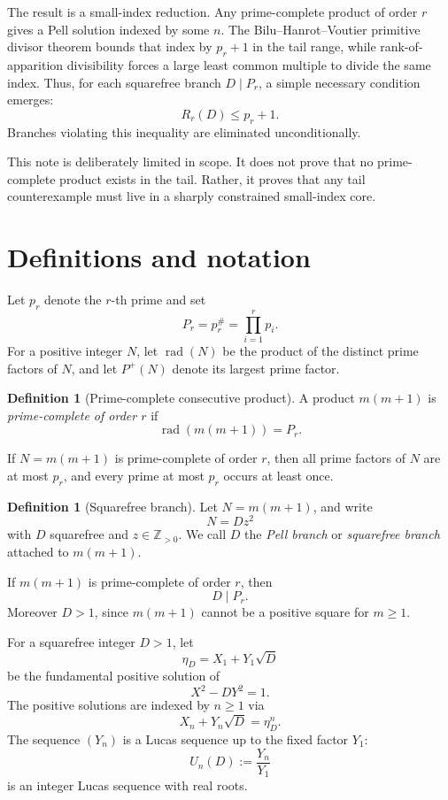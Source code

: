\documentclass[11pt]{article}
\theoremstyle{definition}
\newtheorem{definition}[theorem]{Definition}
\newcommand{\rad}{\operatorname{rad}}
\newcommand{\Z}{\mathbb{Z}}
\begin{document}
The result is a small-index reduction.  Any prime-complete product of order $r$ gives 
a Pell solution indexed by some $n$.  The Bilu--Hanrot--Voutier primitive divisor 
theorem bounds that index by $p_r+1$ in the tail range, while rank-of-apparition 
divisibility forces a large least common multiple to divide the same index.  
Thus, for each squarefree branch $D\mid P_r$, a simple necessary condition emerges:
\[
        R_r(D) \le p_r+1.
\]
Branches violating this inequality are eliminated unconditionally.

This note is deliberately limited in scope.  It does not prove that no prime-complete 
product exists in the tail.  Rather, it proves that any tail counterexample must 
live in a sharply constrained small-index core.

\section{Definitions and notation}

Let $p_r$ denote the $r$-th prime and set
\[
        P_r=p_r^\#=\prod_{i=1}^r p_i.
\]
For a positive integer $N$, let $\rad(N)$ be the product of the distinct prime 
factors of $N$, and let $P^+(N)$ denote its largest prime factor.

\begin{definition}[Prime-complete consecutive product]
A product $m(m+1)$ is \emph{prime-complete of order $r$} if
\[
        \rad(m(m+1))=P_r.
\]
\end{definition}

If $N=m(m+1)$ is prime-complete of order $r$, then all prime factors of $N$ 
are at most $p_r$, and every prime at most $p_r$ occurs at least once.

\begin{definition}[Squarefree branch]
Let $N=m(m+1)$, and write
\[
        N=Dz^2
\]
with $D$ squarefree and $z\in\Z_{>0}$.  We call $D$ the \emph{Pell branch} 
or \emph{squarefree branch} attached to $m(m+1)$.
\end{definition}

If $m(m+1)$ is prime-complete of order $r$, then
\[
        D \mid P_r.
\]
Moreover $D>1$, since $m(m+1)$ cannot be a positive square for $m \ge 1$.

For a squarefree integer $D>1$, let
\[
        \eta_D=X_1+Y_1\sqrt D
\]
be the fundamental positive solution of
\[
        X^2-DY^2=1.
\]
The positive solutions are indexed by $n\ge1$ via
\[
        X_n+Y_n\sqrt D=\eta_D^n.
\]
The sequence $(Y_n)$ is a Lucas sequence up to the fixed factor $Y_1$:
\[
        U_n(D):=\frac{Y_n}{Y_1}
\]
is an integer Lucas sequence with real roots.
\end{document}
